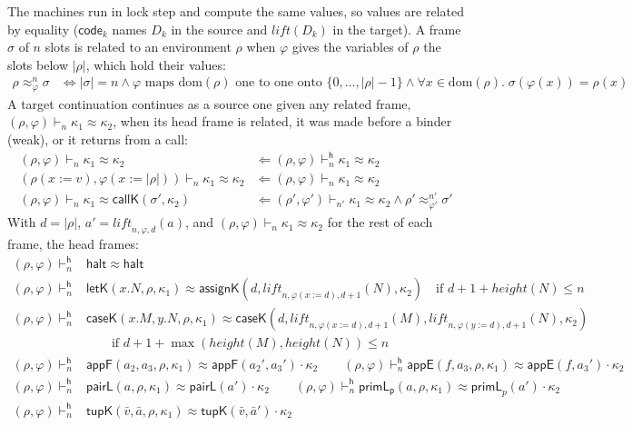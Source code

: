 \documentclass[10pt]{article}
\theoremstyle{acmplain}
\newcommand{\key}[1]{\mathsf{#1}}
\newcommand{\pass}[1]{\mathit{#1}}
\newcommand{\ext}[3]{#1(#2{:=}#3)}
\newcommand{\codeV}[1]{\key{code}_{#1}}
\newcommand{\Kf}[2]{\key{#1}(#2)}
\newcommand{\halt}{\key{halt}}
\begin{document}
The machines run in lock step and compute the same values, so values are
related by equality ($\codeV{k}$ names $D_k$ in the source and
$\pass{lift}(D_k)$ in the target). A frame $\sigma$ of $n$ slots is
related to an environment $\rho$ when $\varphi$ gives the variables of
$\rho$ the slots below $|\rho|$, which hold their values:
\begin{align*}
  \rho \approx^n_\varphi \sigma &\iff |\sigma| = n \land
    \varphi \text{ maps } \mathrm{dom}(\rho) \text{ one to one onto } \{0, \ldots, |\rho| - 1\}
    \land \forall x \in \mathrm{dom}(\rho).\; \sigma(\varphi(x)) = \rho(x)
\end{align*}
A target continuation continues as a source one given any related frame,
$(\rho, \varphi) \vdash_n \kappa_1 \approx \kappa_2$, when its head frame
is related, it was made before a binder (weak), or it returns from a call:
\begin{align*}
  (\rho, \varphi) \vdash_n \kappa_1 \approx \kappa_2
    &\Leftarrow (\rho, \varphi) \vdash^{\mathsf{h}}_n \kappa_1 \approx \kappa_2 \\
  (\ext{\rho}{x}{v}, \ext{\varphi}{x}{|\rho|}) \vdash_n \kappa_1 \approx \kappa_2
    &\Leftarrow (\rho, \varphi) \vdash_n \kappa_1 \approx \kappa_2 \\
  (\rho, \varphi) \vdash_n \kappa_1 \approx \Kf{callK}{\sigma', \kappa_2}
    &\Leftarrow (\rho', \varphi') \vdash_{n'} \kappa_1 \approx \kappa_2
      \land \rho' \approx^{n'}_{\varphi'} \sigma'
\end{align*}
With $d = |\rho|$, $a' = \pass{lift}_{n,\varphi,d}(a)$, and
$(\rho, \varphi) \vdash_n \kappa_1 \approx \kappa_2$ for the rest of
each frame, the head frames:
\begin{align*}
  (\rho, \varphi) \vdash^{\mathsf{h}}_n {}& \halt \approx \halt \\
  (\rho, \varphi) \vdash^{\mathsf{h}}_n {}& \Kf{letK}{x.N, \rho, \kappa_1} \approx
    \Kf{assignK}{d, \pass{lift}_{n,\ext{\varphi}{x}{d},d+1}(N), \kappa_2}
    \quad\text{if } d + 1 + \mathit{height}(N) \leq n \\
  (\rho, \varphi) \vdash^{\mathsf{h}}_n {}& \Kf{caseK}{x.M, y.N, \rho, \kappa_1} \approx
    \Kf{caseK}{d, \pass{lift}_{n,\ext{\varphi}{x}{d},d+1}(M), \pass{lift}_{n,\ext{\varphi}{y}{d},d+1}(N), \kappa_2} \\
    &\qquad \text{if } d + 1 + \max(\mathit{height}(M), \mathit{height}(N)) \leq n \\
  (\rho, \varphi) \vdash^{\mathsf{h}}_n {}& \Kf{appF}{a_2, a_3, \rho, \kappa_1} \approx \key{appF}(a_2', a_3') \cdot \kappa_2 \qquad
  (\rho, \varphi) \vdash^{\mathsf{h}}_n \Kf{appE}{f, a_3, \rho, \kappa_1} \approx \key{appE}(f, a_3') \cdot \kappa_2 \\
  (\rho, \varphi) \vdash^{\mathsf{h}}_n {}& \Kf{pairL}{a, \rho, \kappa_1} \approx \key{pairL}(a') \cdot \kappa_2 \qquad
  (\rho, \varphi) \vdash^{\mathsf{h}}_n \Kf{primL_p}{a, \rho, \kappa_1} \approx \key{primL}_p(a') \cdot \kappa_2 \\
  (\rho, \varphi) \vdash^{\mathsf{h}}_n {}& \Kf{tupK}{\bar{v}, \bar{a}, \rho, \kappa_1} \approx \key{tupK}(\bar{v}, \bar{a}') \cdot \kappa_2
\end{align*}
\end{document}
